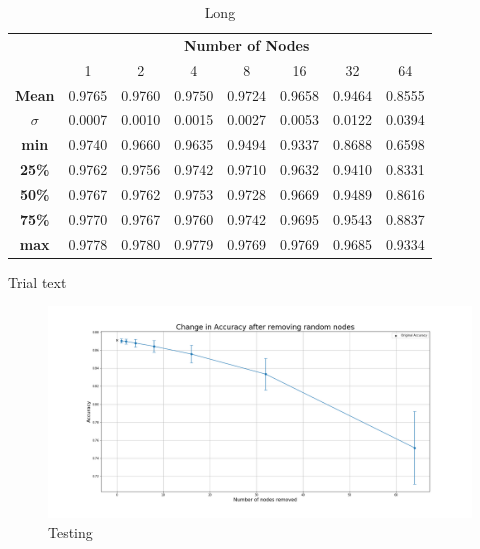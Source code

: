 \documentclass[UKenglish]{ifimaster}
\begin{document}
            \begin{table}[h!]
                \centering
                \begin{tabular}{c | c c c c c c c}
                    & \multicolumn{7}{c}{\textbf{Number of Nodes}} \\
                    \cline{2-8}
                    & 1 & 2 & 4 & 8 & 16 & 32 & 64 \\
                    \hline
                    \textbf{Mean} & 0.9765 & 0.9760 & 0.9750 & 0.9724 & 0.9658 & 0.9464 & 0.8555 \\
                    \textbf{$\sigma$} & 0.0007 & 0.0010 & 0.0015 & 0.0027 & 0.0053 & 0.0122 & 0.0394 \\
                    \textbf{min} & 0.9740 & 0.9660 & 0.9635 & 0.9494 & 0.9337 & 0.8688 & 0.6598 \\
                    \textbf{25\%} & 0.9762 & 0.9756 & 0.9742 & 0.9710 & 0.9632 & 0.9410 & 0.8331 \\
                    \textbf{50\%} & 0.9767 & 0.9762 & 0.9753 & 0.9728 & 0.9669 & 0.9489 & 0.8616 \\
                    \textbf{75\%} & 0.9770 & 0.9767 & 0.9760 & 0.9742 & 0.9695 & 0.9543 & 0.8837 \\
                    \textbf{max} & 0.9778 & 0.9780 & 0.9779 & 0.9769 & 0.9769 & 0.9685 & 0.9334 \\
                    
                \end{tabular}
                \caption[Short]{Long}
            \end{table}

            Trial text

            \begin{figure}[h!]\centering
                \includegraphics[width=\textwidth]{Accuracy_change_random_removal_fmnist.png}
                \caption[Short title]{Testing}
                \label{fig:acc_rn_fmnist}
            \end{figure}
\end{document}
